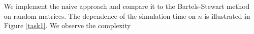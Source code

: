 We implement the naive approach and compare it to the Bartels-Stewart method on random matrices. The dependence of the simulation time on $n$ is illustrated in Figure \ref{task1}. We observe the complexity

